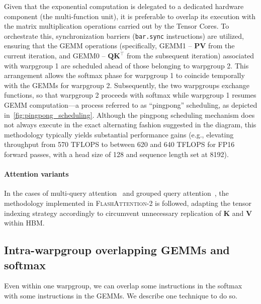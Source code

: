 Given that the exponential computation is delegated to a dedicated hardware component (the multi-function unit), it is preferable to overlap its execution with the matrix multiplication operations carried out by the Tensor Cores. To orchestrate this, synchronization barriers (\texttt{bar.sync} instructions) are utilized, ensuring that the GEMM operations (specifically, GEMM1 -- $\mathbf{P} \mathbf{V}$ from the current iteration, and GEMM0 -- $\mathbf{Q} \mathbf{K}^\top$ from the subsequent iteration) associated with warpgroup 1 are scheduled ahead of those belonging to warpgroup 2. This arrangement allows the softmax phase for warpgroup 1 to coincide temporally with the GEMMs for warpgroup 2. Subsequently, the two warpgroups exchange functions, so that warpgroup 2 proceeds with softmax while warpgroup 1 resumes GEMM computation—a process referred to as ``pingpong'' scheduling, as depicted in~\cref{fig:pingpong_scheduling}. Although the pingpong scheduling mechanism does not always execute in the exact alternating fashion suggested in the diagram, this methodology typically yields substantial performance gains (e.g., elevating throughput from 570 TFLOPS to between 620 and 640 TFLOPS for FP16 forward passes, with a head size of 128 and sequence length set at 8192).

\paragraph{Attention variants} In the cases of multi-query attention~\citep{shazeer2019fast} and grouped query attention~\citep{ainslie2023gqa}, the methodology implemented in \textsc{FlashAttention-2} is followed, adapting the tensor indexing strategy accordingly to circumvent unnecessary replication of $\mathbf{K}$ and $\mathbf{V}$ within HBM.

\subsection{Intra-warpgroup overlapping GEMMs and softmax}

Even within one warpgroup, we can overlap some instructions in the softmax with some instructions in the GEMMs. We describe one technique to do so.

